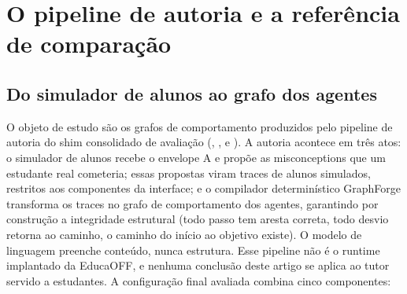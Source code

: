 \documentclass[11pt,a4paper]{article}
\begin{document}
\section{O pipeline de autoria e a referência de comparação}
\label{sec:sistema}

\subsection{Do simulador de alunos ao grafo dos agentes}
\label{sec:sistema-final}

O objeto de estudo são os grafos de comportamento produzidos pelo pipeline de autoria do shim consolidado de avaliação (, ,  e ). A autoria acontece em três atos: o simulador de alunos recebe o envelope A e propõe as misconceptions que um estudante real cometeria; essas propostas viram traces de alunos simulados, restritos aos componentes da interface; e o compilador determinístico GraphForge transforma os traces no grafo de comportamento dos agentes, garantindo por construção a integridade estrutural (todo passo tem aresta correta, todo desvio retorna ao caminho, o caminho do início ao objetivo existe). O modelo de linguagem preenche conteúdo, nunca estrutura. Esse pipeline não é o runtime implantado da EducaOFF, e nenhuma conclusão deste artigo se aplica ao tutor servido a estudantes. A configuração final avaliada combina cinco componentes:
\end{document}
